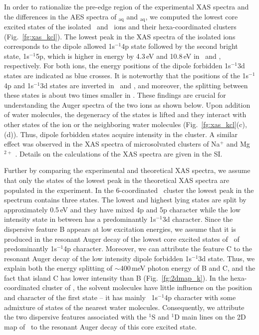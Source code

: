 In order to rationalize the pre-edge region of the experimental XAS spectra and the differences in the AES spectra of \ki$_{\text{aq}}$ and \cli$_{\text{aq}}$, we computed the lowest core excited states of the isolated \ki~and \cli~ions and their hexa-coordinated clusters (Fig.\ \ref{fg:xas_kcl}). The lowest peak in the XAS spectra of the isolated ions corresponds to the dipole allowed 1s$^{-1}$4p state followed by the second bright state, 1s$^{-1}$5p, which is higher in energy by 4.3\,eV and 10.8\,eV in \ki~and \cli, respectively. For both ions, the energy positions of the dipole forbidden 1s$^{-1}$3d states are indicated as blue crosses. It is noteworthy that the positions of the 1s$^{-1}$4p and 1s$^{-1}$3d states are inverted in \ki~and \cli, and moreover, the splitting between these states is about two times smaller in \ki. These findings are crucial for understanding the Auger spectra of the two ions as shown below. Upon addition of water molecules, the degeneracy of the states is lifted and they interact with other states of the ion or the neighboring water molecules (Fig.\ \ref{fg:xas_kcl}(c),(d)). Thus, dipole forbidden states acquire intensity in the cluster. A similar effect was observed in the XAS spectra of microsolvated clusters of Na$^{+}$ and Mg$^{2+}$ \citep{miteva16:16671}. Details on the calculations of the XAS spectra are given in the SI.


Further by comparing the experimental and theoretical XAS spectra, we assume that only the states of the lowest peak in the theoretical XAS spectra are populated in the experiment. In the 6-coordinated \ki~cluster the lowest peak in the spectrum contains three states. The lowest and highest lying states are split by approximately 0.5\,eV and they have mixed 4p and 5p character while the low intensity state in between has a predominantly 1s$^{-1}$3d character. Since the dispersive feature B appears at low excitation energies, we assume that it is produced in the resonant Auger decay of the lowest core excited states of \ki~of predominantly 1s$^{-1}$4p character. Moreover, we can attribute the feature C to the resonant Auger decay of the low intensity dipole forbidden 1s$^{-1}$3d state. Thus, we explain both the energy splitting of $\sim$400\,meV photon energy of B and C, and the fact that island C has lower intensity than B (Fig.\ \ref{fg:2dmap_k}). In the hexa-coordinated cluster of \cli, the solvent molecules have little influence on the position and character of the first state -- it has mainly \cli~1s$^{-1}$4p character with some admixture of states of the nearest water molecules. Consequently, we attribute the two dispersive features associated with the $^1$S and $^1$D main lines on the 2D map of \cli~to the resonant Auger decay of this core excited state. %


